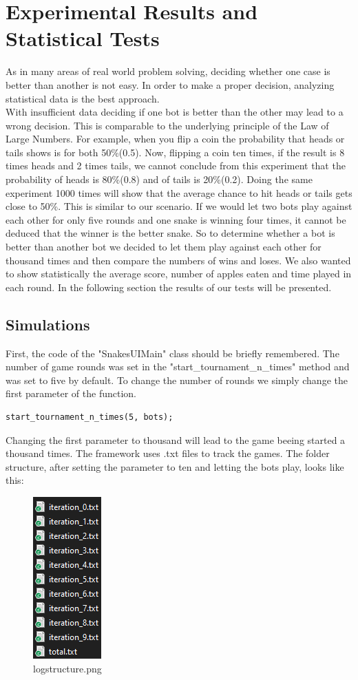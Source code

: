 \documentclass[a4paper,12pt]{article}
\begin{document}
\section{Experimental Results and Statistical Tests}
As in many areas of real world problem solving, deciding whether one case is better than another is not easy. In order to make a proper decision, analyzing statistical data is the best approach.\\
With insufficient data deciding if one bot is better than the other may lead to a wrong decision. This is comparable to the underlying principle of the Law of Large Numbers.\cite{LargeNumbers} For example, when you flip a coin the probability that heads or tails shows is for both 50\%(0.5). Now, flipping a coin ten times, if the result is 8 times heads and 2 times tails, we cannot conclude from this experiment that the probability of heads is 80\%(0.8) and of tails is 20\%(0.2). Doing the same experiment 1000 times will show that the average chance to hit heads or tails gets close to 50\%.
This is similar to our scenario. If we would let two bots play against each other for only five rounds and one snake is winning four times, it cannot be deduced that the winner is the better snake. So to determine whether a bot is better than another bot we decided to let them play against each other for thousand times and then compare the numbers of wins and loses. We also wanted to show statistically the average score, number of apples eaten and time played in each round. In the following section the results of our tests will be presented.\newpage
\subsection{Simulations}
First, the code of the "SnakesUIMain" class should be briefly remembered. The number of game rounds was set in the "start\_tournament\_n\_times" method and was set to five by default. To change the number of rounds we simply change the first parameter of the function.
\begin{verbatim}
start_tournament_n_times(5, bots);
\end{verbatim}
Changing the first parameter to thousand will lead to the game beeing started a thousand times. The framework uses .txt files to track the games. The folder structure, after setting the parameter to ten and letting the bots play, looks like this:
\begin{figure}[H]
    \centering
    \includegraphics[scale=0.8]{logs_structure}
\caption{logstructure.png}
    \label{fig:logs_structure.png}
\end{figure}
\end{document}
